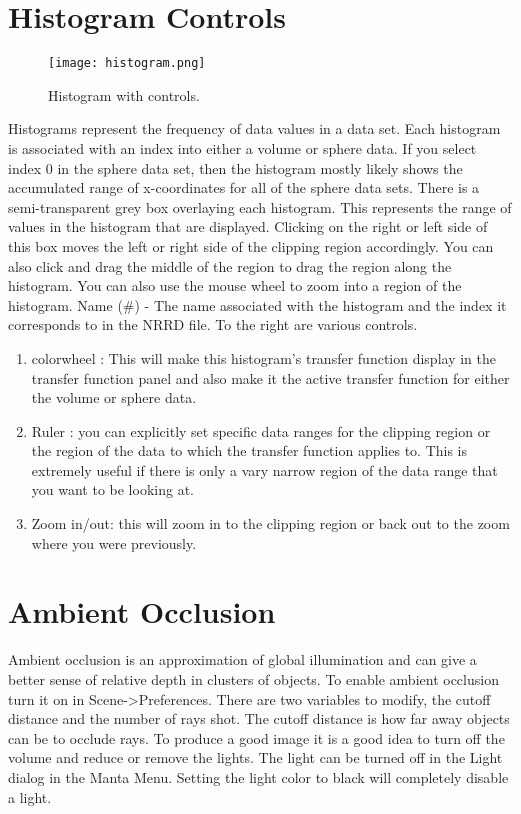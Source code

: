 \section{Histogram Controls}

\begin{figure}[htbp]
  \center
  \texttt{[image: histogram.png]}
  \caption{Histogram with controls.}
  \label{fig:manta_histogram}
\end{figure}

Histograms represent the frequency of data values in a data set. Each histogram is associated with an index into either a volume or sphere data. If you select index 0 in the sphere data set, then the histogram mostly likely shows the accumulated range of x-coordinates for all of the sphere data sets. There is a semi-transparent grey box overlaying each histogram. This represents the range of values in the histogram that are displayed. Clicking on the right or left side of this box moves the left or right side of the clipping region accordingly. You can also click and drag the middle of the region to drag the region along the histogram. You can also use the mouse wheel to zoom into a region of the histogram.
  Name (\#) - The name associated with the histogram and the index it corresponds to in the NRRD file. 
To the right are various controls.

\begin{enumerate}
\item
colorwheel : This will make this histogram's transfer function display in the transfer function panel and also make it the active transfer function for either the volume or sphere data.
\item
Ruler : you can explicitly set specific data ranges for the clipping region or the region of the data to which the transfer function applies to. This is extremely useful if there is only a vary narrow region of the data range that you want to be looking at.
\item
Zoom in/out: this will zoom in to the clipping region or back out to the zoom where you were previously. 
\end{enumerate}

\section{Ambient Occlusion}
  Ambient occlusion is an approximation of global illumination and can give a better sense of relative depth in clusters of objects.  To enable ambient occlusion turn it on in Scene->Preferences.  There are two variables to modify, the cutoff distance and the number of rays shot.  The cutoff distance is how far away objects can be to occlude rays.  To produce a good image it is a good idea to turn off the volume and reduce or remove the lights.  The light can be turned off in the Light dialog in the Manta Menu.  Setting the light color to black will completely disable a light.
  
